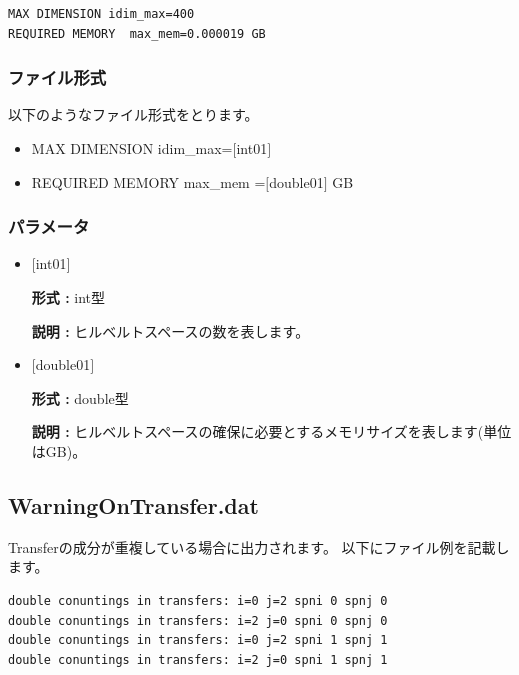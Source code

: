\begin{minipage}{12.5cm}
\begin{screen}
\begin{verbatim}
MAX DIMENSION idim_max=400 
REQUIRED MEMORY  max_mem=0.000019 GB 
\end{verbatim}
\end{screen}
\end{minipage}

\subsubsection{ファイル形式}
以下のようなファイル形式をとります。
 \begin{itemize}
   \item  MAX DIMENSION idim\_max=$[$int01$]$
   \item  REQUIRED MEMORY  max\_mem =$[$double01$]$ GB 
 \end{itemize}
 
\subsubsection{パラメータ}
 \begin{itemize}

    \item  $[$int01$]$ 
   
    {\bf 形式 :} int型

   {\bf 説明 :} ヒルベルトスペースの数を表します。
      
   \item  $[$double01$]$
   
    {\bf 形式 :} double型

    {\bf 説明 :}  ヒルベルトスペースの確保に必要とするメモリサイズを表します(単位はGB)。
 
\end{itemize}

\newpage
\subsection{WarningOnTransfer.dat}
Transferの成分が重複している場合に出力されます。
以下にファイル例を記載します。

\begin{minipage}{12.5cm}
\begin{screen}
\begin{verbatim}
double conuntings in transfers: i=0 j=2 spni 0 spnj 0  
double conuntings in transfers: i=2 j=0 spni 0 spnj 0  
double conuntings in transfers: i=0 j=2 spni 1 spnj 1  
double conuntings in transfers: i=2 j=0 spni 1 spnj 1  
\end{verbatim}
\end{screen}
\end{minipage}

